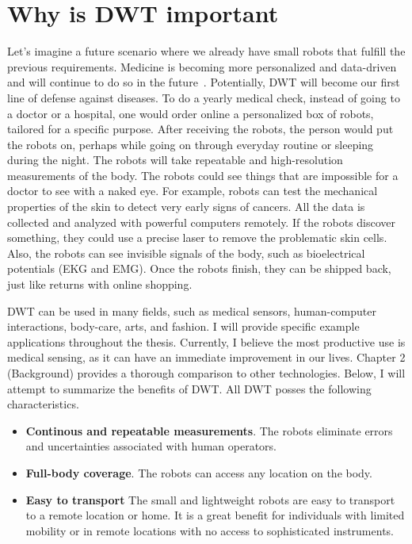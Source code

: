 \section{Why is DWT important}
Let's imagine a future scenario where we already have small robots that fulfill the previous requirements. Medicine is becoming more personalized and data-driven and will continue to do so in the future~\cite{piwek2016rise}. Potentially, DWT will become our first line of defense against diseases. To do a yearly medical check, instead of going to a doctor or a hospital, one would order online a personalized box of robots,  tailored for a specific purpose. After receiving the robots, the person would put the robots on, perhaps while going on through everyday routine or sleeping during the night. The robots will take repeatable and high-resolution measurements of the body. The robots could see things that are impossible for a doctor to see with a naked eye. For example, robots can test the mechanical properties of the skin to detect very early signs of cancers. All the data is collected and analyzed with powerful computers remotely.  If the robots discover something, they could use a precise laser to remove the problematic skin cells. Also, the robots can see invisible signals of the body, such as bioelectrical potentials (EKG and EMG). Once the robots finish, they can be shipped back, just like returns with online shopping. 

DWT can be used in many fields, such as medical sensors, human-computer interactions, body-care, arts, and fashion. I will provide specific example applications throughout the thesis. Currently, I believe the most productive use is medical sensing, as it can have an immediate improvement in our lives. Chapter 2 (Background) provides a  thorough comparison to other technologies. Below, I will attempt to summarize the benefits of DWT. 
All DWT posses the following characteristics.
\begin{itemize} 
\item \textbf{Continous and repeatable measurements}. The robots eliminate errors and uncertainties associated with human operators. 
\item \textbf{Full-body coverage}. The robots can access any location on the body. 
\item \textbf{Easy to transport}
The small and lightweight robots are easy to transport to a remote location or home. It is a great benefit for individuals with limited mobility or in remote locations with no access to sophisticated instruments. 
\end{itemize} 


